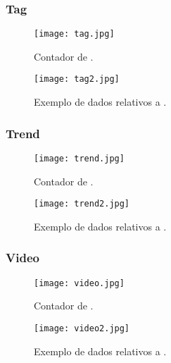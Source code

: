 \subsubsection{Tag}

  \begin{figure}[H]
    \centering
    \begin{minipage}[b]{0.25\textwidth}
        \centering
        \texttt{[image: tag.jpg]}
        \caption{Contador de .}
    \end{minipage}
    \hspace{0.05\textwidth}
    \begin{minipage}[b]{0.6\textwidth}
        \centering
        \texttt{[image: tag2.jpg]}
        \caption{Exemplo de dados relativos a .}
    \end{minipage}
  \end{figure}

\subsubsection{Trend}

  \begin{figure}[H]
    \centering
    \begin{minipage}[b]{0.25\textwidth}
        \centering
        \texttt{[image: trend.jpg]}
        \caption{Contador de .}
    \end{minipage}
    \hspace{0.05\textwidth}
    \begin{minipage}[b]{0.6\textwidth}
        \centering
        \texttt{[image: trend2.jpg]}
        \caption{Exemplo de dados relativos a .}
    \end{minipage}
  \end{figure}

\subsubsection{Video}

  \begin{figure}[H]
    \centering
    \begin{minipage}[b]{0.25\textwidth}
        \centering
        \texttt{[image: video.jpg]}
        \caption{Contador de .}
    \end{minipage}
    \hspace{0.05\textwidth}
    \begin{minipage}[b]{0.6\textwidth}
        \centering
        \texttt{[image: video2.jpg]}
        \caption{Exemplo de dados relativos a .}
    \end{minipage}
  \end{figure}


